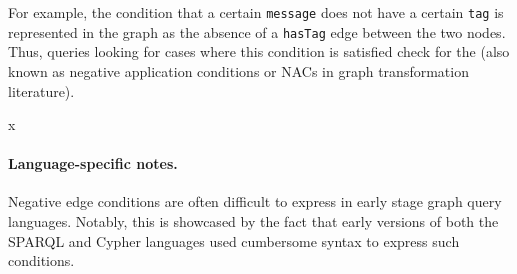 
For example, the condition that a certain \texttt{message} does not have a certain \texttt{tag} is represented in the graph as the absence of a \texttt{hasTag} edge between the two nodes. Thus, queries looking for cases where this condition is satisfied check for the (also known as negative application conditions or NACs in graph transformation literature).

x

\noindent\paragraph{Language-specific notes.}

Negative edge conditions are often difficult to express in early stage graph query languages. Notably, this is showcased by the fact that early versions of both the SPARQL and Cypher languages used cumbersome syntax to express such conditions.

